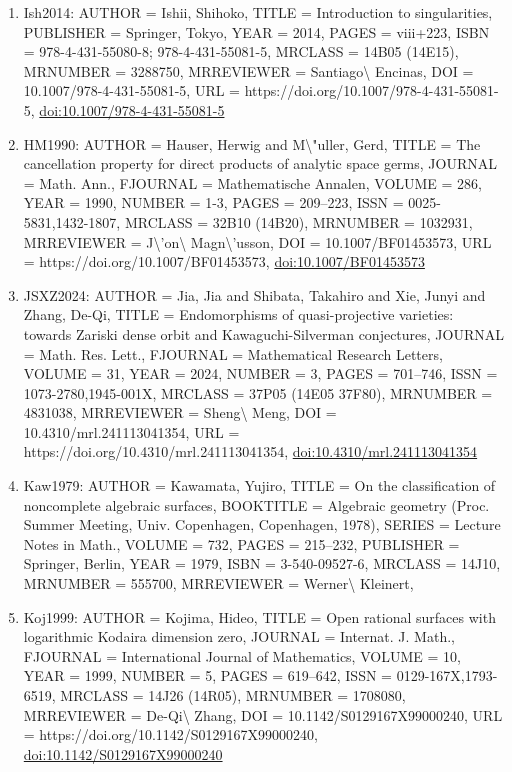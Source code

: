 \documentclass[11pt]{article}
\begin{document}
\begin{enumerate}[leftmargin=*]
  \item Ish2014: AUTHOR = Ishii, Shihoko, TITLE = Introduction to singularities, PUBLISHER = Springer, Tokyo, YEAR = 2014, PAGES = viii+223, ISBN = 978-4-431-55080-8; 978-4-431-55081-5, MRCLASS = 14B05 (14E15), MRNUMBER = 3288750, MRREVIEWER = Santiago\textbackslash{} Encinas, DOI = 10.1007/978-4-431-55081-5, URL = https://doi.org/10.1007/978-4-431-55081-5, \href{https://doi.org/10.1007/978-4-431-55081-5}{doi:10.1007/978-4-431-55081-5}
  \item HM1990: AUTHOR = Hauser, Herwig and M\textbackslash{}"uller, Gerd, TITLE = The cancellation property for direct products of analytic space germs, JOURNAL = Math. Ann., FJOURNAL = Mathematische Annalen, VOLUME = 286, YEAR = 1990, NUMBER = 1-3, PAGES = 209--223, ISSN = 0025-5831,1432-1807, MRCLASS = 32B10 (14B20), MRNUMBER = 1032931, MRREVIEWER = J\textbackslash{}'on\textbackslash{} Magn\textbackslash{}'usson, DOI = 10.1007/BF01453573, URL = https://doi.org/10.1007/BF01453573, \href{https://doi.org/10.1007/BF01453573}{doi:10.1007/BF01453573}
  \item JSXZ2024: AUTHOR = Jia, Jia and Shibata, Takahiro and Xie, Junyi and Zhang, De-Qi, TITLE = Endomorphisms of quasi-projective varieties: towards Zariski dense orbit and Kawaguchi-Silverman conjectures, JOURNAL = Math. Res. Lett., FJOURNAL = Mathematical Research Letters, VOLUME = 31, YEAR = 2024, NUMBER = 3, PAGES = 701--746, ISSN = 1073-2780,1945-001X, MRCLASS = 37P05 (14E05 37F80), MRNUMBER = 4831038, MRREVIEWER = Sheng\textbackslash{} Meng, DOI = 10.4310/mrl.241113041354, URL = https://doi.org/10.4310/mrl.241113041354, \href{https://doi.org/10.4310/mrl.241113041354}{doi:10.4310/mrl.241113041354}
  \item Kaw1979: AUTHOR = Kawamata, Yujiro, TITLE = On the classification of noncomplete algebraic surfaces, BOOKTITLE = Algebraic geometry (Proc. Summer Meeting, Univ. Copenhagen, Copenhagen, 1978), SERIES = Lecture Notes in Math., VOLUME = 732, PAGES = 215--232, PUBLISHER = Springer, Berlin, YEAR = 1979, ISBN = 3-540-09527-6, MRCLASS = 14J10, MRNUMBER = 555700, MRREVIEWER = Werner\textbackslash{} Kleinert,
  \item Koj1999: AUTHOR = Kojima, Hideo, TITLE = Open rational surfaces with logarithmic Kodaira dimension zero, JOURNAL = Internat. J. Math., FJOURNAL = International Journal of Mathematics, VOLUME = 10, YEAR = 1999, NUMBER = 5, PAGES = 619--642, ISSN = 0129-167X,1793-6519, MRCLASS = 14J26 (14R05), MRNUMBER = 1708080, MRREVIEWER = De-Qi\textbackslash{} Zhang, DOI = 10.1142/S0129167X99000240, URL = https://doi.org/10.1142/S0129167X99000240, \href{https://doi.org/10.1142/S0129167X99000240}{doi:10.1142/S0129167X99000240}

\end{enumerate}
\end{document}
